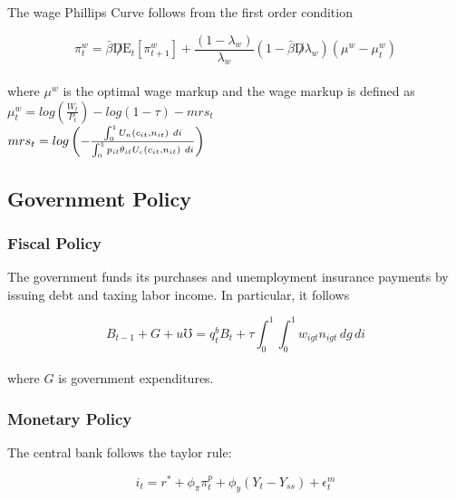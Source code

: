 \documentclass[titlepage]{\econtex}\providecommand{\texname}{BufferStockTheory}
\begin{document}
The wage Phillips Curve follows from the first order condition


$$ \pi_{t}^{w} =   \bar{\beta} \not D  \mathrm{E}_{t} \left[ \pi_{t+1}^{w}\right] + \frac{(1-\lambda_{w})}{\lambda_{w}} (1- \bar{\beta} \not D \lambda_{w}) (\mu^{w} - \mu_{t}^{w})$$ \\

where $\mu^{w}$ is the optimal wage markup and the wage markup is defined as \\ 

$\mu_{t}^{w} = log\left( \frac{W_{t}}{P_{t}}\right)  - log\left(1 -\tau \right) - mrs_{t}$ \\


$ mrs_{t} = log \left(- \frac{\int_{0}^{1}   U_{n} \left(c_{i t}, n_{i t} \right) \ d i  }{\int_{0}^{1}  p_{it} \theta_{it} U_{c} \left(c_{i t}, n_{i t} \right) \  di } \right) \\ \\ $


\hypertarget{Government Policy}{}
\subsection{Government Policy}



\hypertarget{Fiscal Policy}{}
\subsubsection{Fiscal Policy}

The government funds its purchases and unemployment insurance payments by issuing debt and taxing labor income. In particular, it follows 

$$ B_{t-1} + G + \mathit{u} \mho =   q^{b}_{t} B_{t} +  \tau \int_{0}^{1} \int_{0}^{1} w_{igt} n_{igt} \, dg \, di$$ \\

where $G $ is government expenditures. \\



\hypertarget{Monetary Policy}{}
\subsubsection{Monetary Policy}


The central bank follows the taylor rule: 

$$i_{t} = r^{*} +\phi_{\pi} \pi^{p}_{t} + \phi_{y} (Y_{t} - Y_{ss}) + \epsilon^{m}_{t}$$ \\
\end{document}
